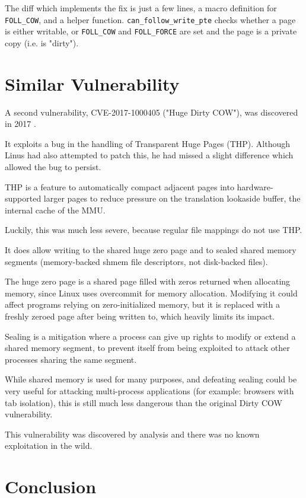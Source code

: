 \documentclass[a4paper,10pt,twocolumn,english]{article}
\newcommand{\code}[1]{\texttt{#1}}
\begin{document}
The diff which implements the fix is just a few lines, a macro definition for \code{FOLL\_COW}, and a helper function.
\code{can\_follow\_write\_pte} checks whether a page is either writable, or \code{FOLL\_COW} and \code{FOLL\_FORCE} are set and the page is a private copy (i.e. is "dirty").

\section{Similar Vulnerability}

A second vulnerability, CVE-2017-1000405 ("Huge Dirty COW"), was discovered in 2017 \cite{bindency2017hugedirtycow}.

It exploits a bug in the handling of Transparent Huge Pages (THP). Although Linus had also attempted to patch this, he had missed a slight difference which allowed the bug to persist.

THP is a feature to automatically compact adjacent pages into hardware-supported larger pages to reduce pressure on the translation lookaside buffer, the internal cache of the MMU.

Luckily, this was much less severe, because regular file mappings do not use THP.

It does allow writing to the shared huge zero page and to sealed shared memory segments (memory-backed shmem file descriptors, not disk-backed files).

The huge zero page is a shared page filled with zeros returned when allocating memory, since Linux uses overcommit for memory allocation.
Modifying it could affect programs relying on zero-initialized memory, but
it is replaced with a freshly zeroed page after being written to, which heavily limits its impact.

Sealing is a mitigation where a process can give up rights to modify or extend a shared memory segment,
to prevent itself from being exploited to attack other processes sharing the same segment.

While shared memory is used for many purposes, and defeating sealing could be very useful for attacking multi-process applications (for example: browsers with tab isolation),
this is still much less dangerous than the original Dirty COW vulnerability.

This vulnerability was discovered by analysis and there was no known exploitation in the wild.

\section{Conclusion}
\end{document}
